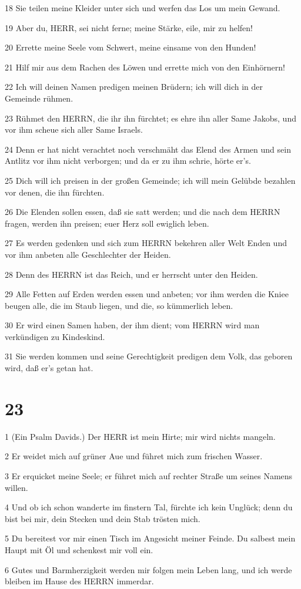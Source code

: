 \par 18 Sie teilen meine Kleider unter sich und werfen das Los um mein Gewand.
\par 19 Aber du, HERR, sei nicht ferne; meine Stärke, eile, mir zu helfen!
\par 20 Errette meine Seele vom Schwert, meine einsame von den Hunden!
\par 21 Hilf mir aus dem Rachen des Löwen und errette mich von den Einhörnern!
\par 22 Ich will deinen Namen predigen meinen Brüdern; ich will dich in der Gemeinde rühmen.
\par 23 Rühmet den HERRN, die ihr ihn fürchtet; es ehre ihn aller Same Jakobs, und vor ihm scheue sich aller Same Israels.
\par 24 Denn er hat nicht verachtet noch verschmäht das Elend des Armen und sein Antlitz vor ihm nicht verborgen; und da er zu ihm schrie, hörte er's.
\par 25 Dich will ich preisen in der großen Gemeinde; ich will mein Gelübde bezahlen vor denen, die ihn fürchten.
\par 26 Die Elenden sollen essen, daß sie satt werden; und die nach dem HERRN fragen, werden ihn preisen; euer Herz soll ewiglich leben.
\par 27 Es werden gedenken und sich zum HERRN bekehren aller Welt Enden und vor ihm anbeten alle Geschlechter der Heiden.
\par 28 Denn des HERRN ist das Reich, und er herrscht unter den Heiden.
\par 29 Alle Fetten auf Erden werden essen und anbeten; vor ihm werden die Kniee beugen alle, die im Staub liegen, und die, so kümmerlich leben.
\par 30 Er wird einen Samen haben, der ihm dient; vom HERRN wird man verkündigen zu Kindeskind.
\par 31 Sie werden kommen und seine Gerechtigkeit predigen dem Volk, das geboren wird, daß er's getan hat.

\chapter{23}

\par 1 (Ein Psalm Davids.) Der HERR ist mein Hirte; mir wird nichts mangeln.
\par 2 Er weidet mich auf grüner Aue und führet mich zum frischen Wasser.
\par 3 Er erquicket meine Seele; er führet mich auf rechter Straße um seines Namens willen.
\par 4 Und ob ich schon wanderte im finstern Tal, fürchte ich kein Unglück; denn du bist bei mir, dein Stecken und dein Stab trösten mich.
\par 5 Du bereitest vor mir einen Tisch im Angesicht meiner Feinde. Du salbest mein Haupt mit Öl und schenkest mir voll ein.
\par 6 Gutes und Barmherzigkeit werden mir folgen mein Leben lang, und ich werde bleiben im Hause des HERRN immerdar.


